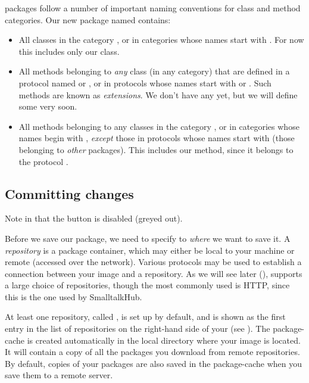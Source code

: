 \documentclass[a4paper,10pt,twoside]{book}
\begin{document}
\Mont packages follow a number of important naming conventions for class and method categories.
Our new package named  contains:

\begin{itemize}

\item All classes in the category , or in categories whose names start with . For now this includes only our  class. 

\item All methods belonging to \emph{any} class (in any category) that are defined in a protocol named  or , or in protocols whose names start with  or . Such methods are known as \emph{extensions}. We don't have any yet, but we will define some very soon.

\item All methods belonging to any classes in the category , or in categories whose names begin with , \emph{except} those in protocols whose names start with \prot{*} (\ie those belonging to \emph{other} packages). This includes our  method, since it belongs to the protocol .

\end{itemize}

\subsection{Committing changes}

Note in  that the  button is disabled (greyed out).

Before we save our  package, we need to specify to \emph{where} we want to save it. A \emph{repository} is a package container, which may either be local to your machine or remote (accessed over the network). 
Various protocols may be used to establish a connection between your \pharo image and a repository. As we will see later (), \Mont supports a large choice of repositories, though the most commonly used is HTTP, since this is the one used by SmalltalkHub.

At least one repository, called , is set up by default, and is shown as the first entry in the list of repositories on the right-hand side of your \MCB (see ).
The package-cache is created automatically in the local directory where your \pharo image is located. It will contain a copy of all the packages you download from remote repositories. 
By default, copies of your packages are also saved in the package-cache when you save them to a remote server.
\end{document}
